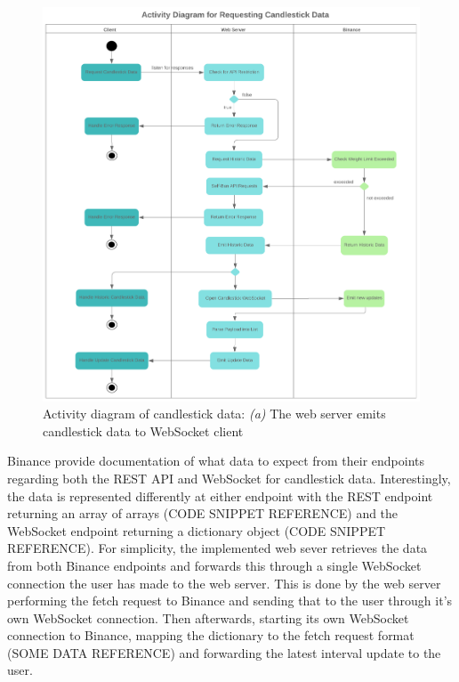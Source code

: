 \begin{figure}[!htb]
    \centering
	\includegraphics[width=\textwidth]{content/graphics/diagrams/AD_KLINE.png}
	\caption{Activity diagram of candlestick data: 
	\textit{(a)} The web server emits candlestick data to WebSocket client}
    
	\label{fig:implementation:actor_dataflow}
\end{figure}

Binance provide documentation of what data to expect from their endpoints regarding both the REST API and WebSocket for candlestick data. Interestingly, the data is represented differently at either endpoint with the REST endpoint returning an array of arrays (CODE SNIPPET REFERENCE) and the WebSocket endpoint returning a dictionary object (CODE SNIPPET REFERENCE). %
For simplicity, the implemented web sever retrieves the data from both Binance endpoints and forwards this through a single WebSocket connection the user has made to the web server. This is done by the web server performing the fetch request to Binance and sending that to the user through it's own WebSocket connection. Then afterwards, starting its own WebSocket connection to Binance, mapping the dictionary to the fetch request format (SOME DATA REFERENCE) and forwarding the latest interval update to the user.

